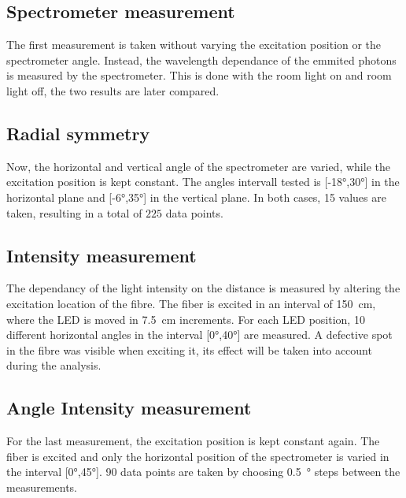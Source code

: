 \subsection{Spectrometer measurement}
The first measurement is taken without varying the excitation position or the spectrometer angle. Instead, the wavelength
dependance of the emmited photons is measured by the spectrometer. This is done with the room light on and room light off,
the two results are later compared.

\subsection{Radial symmetry}
Now, the horizontal and vertical angle of the spectrometer are varied, while the excitation position is kept constant.
The angles intervall tested is [-18°,30°] in the horizontal plane and [-6°,35°] in the vertical plane. In both cases,
15 values are taken, resulting in a total of $225$ data points.

\subsection{Intensity measurement}
The dependancy of the light intensity on the distance is measured by altering the excitation location of the fibre.
The fiber is excited in an interval of \qty{150}{\centi\meter}, where the LED is moved in \qty{7.5}{\centi\meter}
increments. For each LED position, 10 different horizontal angles in the interval [0°,40°] are measured.
A defective spot in the fibre was visible when exciting it, its effect will be taken into account during the analysis.

\subsection{Angle Intensity measurement}
For the last measurement, the excitation position is kept constant again. The fiber is excited and only the
horizontal position of the spectrometer is varied in the interval [0°,45°]. 90 data points are taken by choosing
\qty{0.5}{\degree} steps between the measurements.
